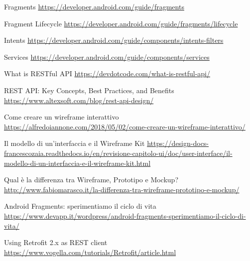 \documentclass[noexaminfo, Lau, oneside]{sapthesis}
\begin{document}
\begin{thebibliography}{17}
Fragments
\url{https://developer.android.com/guide/fragments}

Fragment Lifecycle
\url{https://developer.android.com/guide/fragments/lifecycle}

Intents
\url{https://developer.android.com/guide/components/intents-filters}

Services
\url{https://developer.android.com/guide/components/services}

What is RESTful API
\url{https://devdotcode.com/what-is-restful-api/}

REST API: Key Concepts, Best Practices, and Benefits
\url{https://www.altexsoft.com/blog/rest-api-design/}

Come creare un wireframe interattivo
\url{https://alfredoiannone.com/2018/05/02/come-creare-un-wireframe-interattivo/}

Il modello di un’interfaccia e il Wireframe Kit
\url{https://design-docs-francescozaia.readthedocs.io/en/revisione-capitolo-ui/doc/user-interface/il-modello-di-un-interfaccia-e-il-wireframe-kit.html}

Qual è la differenza tra Wireframe, Prototipo e Mockup?
\url{http://www.fabiomarasco.it/la-differenza-tra-wireframe-prototipo-e-mockup/}

Android Fragments: sperimentiamo il ciclo di vita
\url{https://www.devapp.it/wordpress/android-fragments-sperimentiamo-il-ciclo-di-vita/}

Using Retrofit 2.x as REST client
\url{https://www.vogella.com/tutorials/Retrofit/article.html}

\end{thebibliography}
\end{document}
